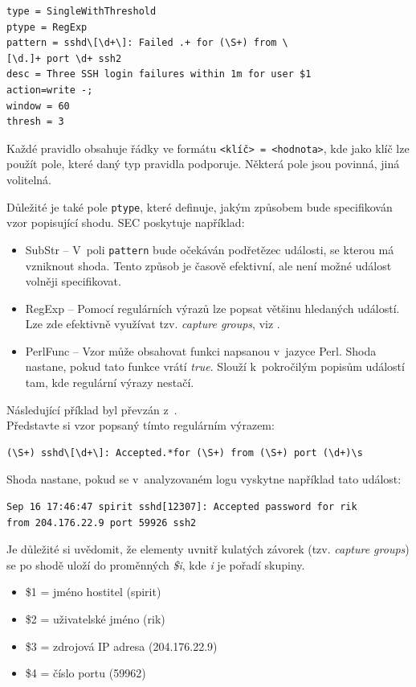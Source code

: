 \documentclass[thesis=B,czech]{FITthesis}[2012/06/26]
\begin{document}
\begin{lstlisting}[frame=single,caption=Ukázka pravidla typu SingleWithThreshold,label=exampleSingleWithThreshold]
type = SingleWithThreshold
ptype = RegExp
pattern = sshd\[\d+\]: Failed .+ for (\S+) from \
[\d.]+ port \d+ ssh2
desc = Three SSH login failures within 1m for user $1
action=write -;
window = 60
thresh = 3
\end{lstlisting}

Každé pravidlo obsahuje řádky ve formátu \texttt{<klíč> = <hodnota>}, kde jako klíč lze použít pole, které daný typ pravidla podporuje. Některá pole jsou povinná, jiná volitelná.

Důležité je také pole \texttt{ptype}, které definuje, jakým způsobem bude specifikován vzor popisující shodu. SEC poskytuje například: \cite{secManPage}
\begin{itemize}
	\item SubStr -- V~poli \texttt{pattern} bude očekáván podřetězec události, se kterou má vzniknout shoda. Tento způsob je časově efektivní, ale není možné událost volněji specifikovat.
	\item RegExp -- Pomocí regulárních výrazů lze popsat většinu hledaných událostí. Lze zde efektivně využívat tzv. \textit{capture groups}, viz \cite{namedCaptureGroups}.
	\item PerlFunc -- Vzor může obsahovat funkci napsanou v~jazyce Perl. Shoda nastane, pokud tato funkce vrátí \textit{true}. Slouží k~pokročilým popisům událostí tam, kde regulární výrazy nestačí.
\end{itemize}

Následující příklad byl převzán z~\cite{usingSEC}.\\
Představte si vzor popsaný tímto regulárním výrazem: 
\begin{verbatim}
(\S+) sshd\[\d+\]: Accepted.*for (\S+) from (\S+) port (\d+)\s
\end{verbatim}

Shoda nastane, pokud se v~analyzovaném logu vyskytne například tato událost:
\begin{verbatim}
Sep 16 17:46:47 spirit sshd[12307]: Accepted password for rik 
from 204.176.22.9 port 59926 ssh2
\end{verbatim}
\newpage
Je důležité si uvědomit, že elementy uvnitř kulatých závorek (tzv. \textit{capture groups}) se po shodě uloží do proměnných \textit{\$i}, kde \textit{i} je pořadí skupiny.

\begin{itemize}
	\item \$1 = jméno hostitel (spirit)
	\item \$2 = uživatelské jméno (rik)
	\item \$3 = zdrojová IP adresa (204.176.22.9)
	\item \$4 = číslo portu (59962)
\end{itemize}
\end{document}
